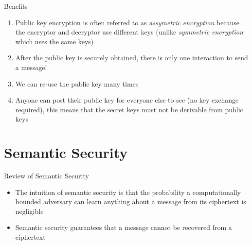 \documentclass[handout]{beamer}
\begin{document}
\begin{frame}{Benefits}
    \begin{enumerate}
        \item \pause Public key encryption is often referred to as \textit{assymetric encryption} because the encryptor and decryptor use different keys (unlike \textit{symmetric encryption} which uses the same keys)
        \item \pause After the public key is securely obtained, there is only one interaction to send a message!
        \item \pause We can re-use the public key many times
        \item \pause Anyone can post their public key for everyone else to see (no key exchange required), this means that the secret keys must not be derivable from public keys
    \end{enumerate}
\end{frame}

\section{Semantic Security}

\begin{frame}{Review of Semantic Security}
  \begin{itemize}
    \item \pause The intuition of semantic security is that the probability a computationally bounded adversary can learn anything about a message from its ciphertext is negligible
    \item \pause Semantic security guarantees that a message cannot be recovered from a ciphertext
  \end{itemize}
\end{frame}
\end{document}

